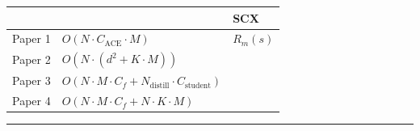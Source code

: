 \documentclass[
  12pt,
]{article}
\begin{document}
\begin{longtable}[]{@{}
  >{\raggedright\arraybackslash}p{}
  >{\raggedright\arraybackslash}p{}
  >{\raggedright\arraybackslash}p{}@{}}
\toprule\noalign{}
\begin{minipage}[b]{\linewidth}\raggedright

\end{minipage} & \begin{minipage}[b]{\linewidth}\raggedright

\end{minipage} & \begin{minipage}[b]{\linewidth}\raggedright
 SCX 
\end{minipage} \\
\midrule\noalign{}
\endhead
\bottomrule\noalign{}
\endlastfoot
Paper 1 & \(O(N \cdot C_{\text{ACE}} \cdot M)\) &  \(R_m(s)\)
 \\
Paper 2 & \(O(N \cdot (d^2 + K \cdot M))\) &  \\
Paper 3 &
\(O(N \cdot M \cdot C_f + N_{\text{distill}} \cdot C_{\text{student}})\)
&  \\
Paper 4 & \(O(N \cdot M \cdot C_f + N \cdot K \cdot M)\) &
 \\
\end{longtable}

\begin{center}\rule{0.5\linewidth}{0.5pt}\end{center}

\subsection{}\label{ux5b8cux6574ux7cfbux7edfux67b6ux6784ux56fe}
\end{document}
